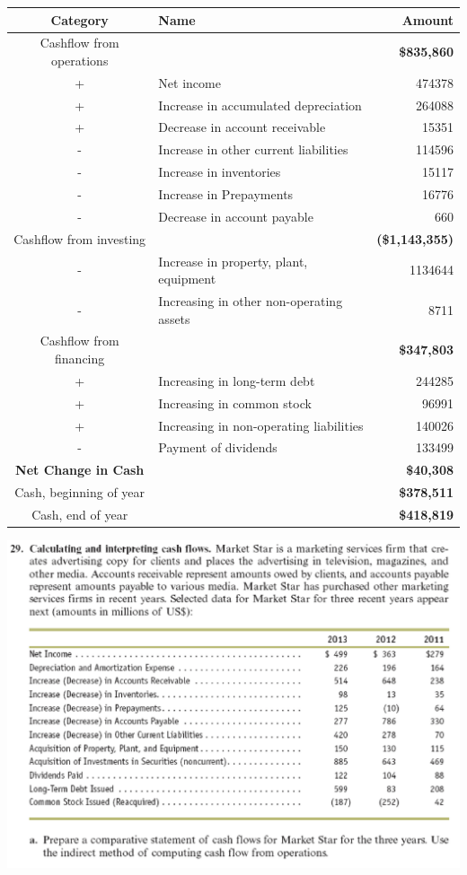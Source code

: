 \documentclass[
  letterpaper,
  DIV=11,
  numbers=noendperiod]{scrreprt}
\begin{document}
\begin{longtable}[]{@{}clr@{}}
\toprule\noalign{}
Category & Name & Amount \\
\midrule\noalign{}
\endhead
\bottomrule\noalign{}
\endlastfoot
Cashflow from operations & & \textbf{\$835,860} \\
+ & Net income & 474378 \\
+ & Increase in accumulated depreciation & 264088 \\
+ & Decrease in account receivable & 15351 \\
- & Increase in other current liabilities & 114596 \\
- & Increase in inventories & 15117 \\
- & Increase in Prepayments & 16776 \\
- & Decrease in account payable & 660 \\
Cashflow from investing & & \textbf{(\$1,143,355)} \\
- & Increase in property, plant, equipment & 1134644 \\
- & Increasing in other non-operating assets & 8711 \\
Cashflow from financing & & \textbf{\$347,803} \\
+ & Increasing in long-term debt & 244285 \\
+ & Increasing in common stock & 96991 \\
+ & Increasing in non-operating liabilities & 140026 \\
- & Payment of dividends & 133499 \\
\textbf{Net Change in Cash} & & \textbf{\$40,308} \\
Cash, beginning of year & & \textbf{\$378,511} \\
Cash, end of year & & \textbf{\$418,819} \\
\end{longtable}

\includegraphics{images/재무회계_6-29.png}
\end{document}
